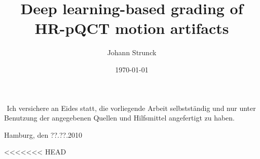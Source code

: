 \documentclass[
a4paper, 
12pt,
grayscalebody, %
abstract=on,
twoside, BCOR10mm, 12pt, DIV13,headinclude, footexclude, final, abstracton, openright
]{ibireprt}
\author{Johann Strunck}
\title{Deep learning-based grading of HR-pQCT motion artifacts}
\date{\today}
\numberwithin{equation}{chapter}
\numberwithin{table}{chapter}
\numberwithin{figure}{chapter}
\numberwithin{algorithm}{chapter}
\numberwithin{example}{chapter}
\numberwithin{example}{chapter}
\begin{document}
\maketitle


\newpage
${}^{}$
\vfill
\noindent
Ich versichere an Eides statt, die vorliegende Arbeit selbstständig und nur unter Benutzung der angegebenen Quellen und Hilfsmittel angefertigt zu haben.\\
\vspace{1.5cm}

\noindent
Hamburg, den ??.??.2010
\thispagestyle{empty}
\newpage
\newpage

\setlength{\parskip}{1.5mm }





\tableofcontents


<<<<<<< HEAD
\end{document}
